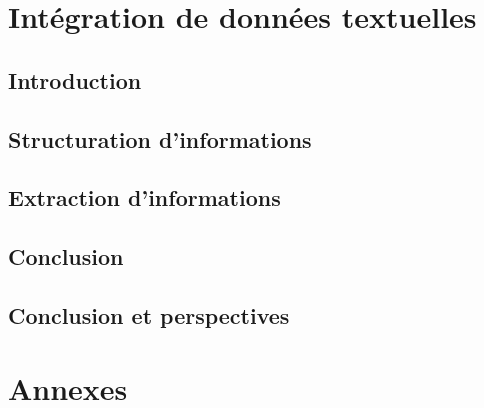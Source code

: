 
\part{Intégration de données textuelles}

\chapter{Introduction}
\minitoc


\chapter{Structuration d'informations}
\minitoc


\chapter{Extraction d'informations}
\minitoc


\chapter{Conclusion}



\chapter{Conclusion et perspectives}


\cleardoublepage    %
\appendix
\part{Annexes}

\clearpage
\backmatter


\printglossary
{}
\printglossary[type=acronym]
